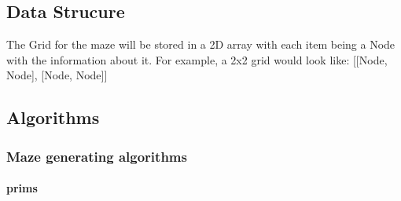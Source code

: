 \documentclass{article}
\begin{document}
\subsection{Data Strucure}
The Grid for the maze will be stored in a 2D array with each item being a Node with the information about it. For example, a 2x2 grid would look like: [[Node, Node], [Node, Node]]

\subsection{Algorithms}
\subsubsection{Maze generating algorithms}
\paragraph{prims}
\end{document}
